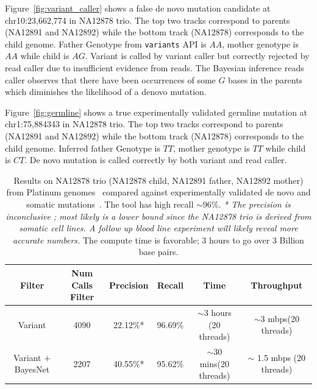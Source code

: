 \documentclass{article}
\begin{document}
\vspace{1em}
Figure~\ref{fig:variant_caller} shows a false de novo mutation  candidate at chr10:23,662,774 in NA12878 trio. The top two tracks correspond to parents (NA12891 and NA12892) while the bottom track (NA12878) corresponds to the child genome. Father Genotype from \verb|variants| API is $AA$, mother genotype is $AA$ while child is $AG$. Variant is called by variant caller but correctly rejected by read caller due to insufficient evidence from reads. The Bayesian inference reads caller observes that there have been occurrences of some $G$ bases in the parents which diminishes the likelihood of a denovo mutation.

\vspace{1em}
Figure~\ref{fig:germline} shows a true experimentally validated germline mutation at chr1:75,884343 in NA12878 trio. The top two tracks correspond to parents (NA12891 and NA12892) while the bottom track (NA12878) corresponds to the child genome. Inferred father Genotype is $TT$, mother genotype is $TT$ while child is $CT$. De novo mutation is called correctly by both variant and read caller. 

\begin{table}
    \label{tab:NA12878}
    \centering
    \begin{tabular}{ | c | c | c | c | c | c |}
    \hline
    \textbf{Filter} & \textbf{Num Calls Filter} & \textbf{Precision} & \textbf{Recall }& \textbf{Time} & \textbf{Throughput} \\ \hline
	Variant & 4090 & 22.12\%* & 96.69\% & $\sim$3 hours (20 threads) & $\sim$3 mbps(20 threads) \\\hline
	Variant $+$ BayesNet & 2207 & 40.55\%* & 95.62\% & $\sim$30 mins(20 threads) & $\sim$ 1.5 mbps
(20 threads) \\
    \hline
    \end{tabular}
    \caption{Results on NA12878 trio (NA12878 child, NA12891 father, NA12892 mother) from Platinum genomes~\cite{platinum} compared against experimentally validated de novo and somatic mutations~\cite{Conrad2011}. The tool has high recall $\sim 96\%$. \textit{* The precision is inconclusive ; most likely is a lower bound since the NA12878 trio is derived from somatic cell lines. A follow up blood line experiment will likely reveal more accurate numbers.} The compute time is favorable; 3 hours to go over 3 Billion base pairs. }
\end{table}
\end{document}
